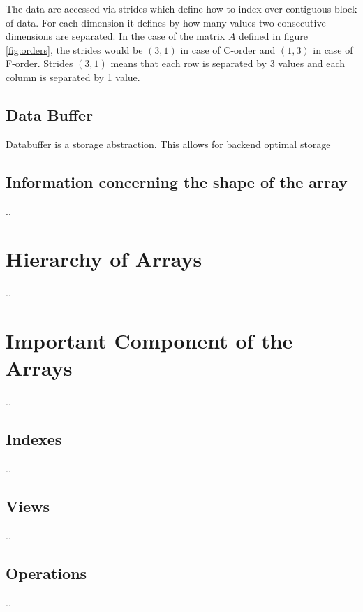 The data are accessed via strides which define how to index over contiguous block of data. For each dimension it defines by how many values two consecutive dimensions are separated. In the case of the matrix $A$ defined in figure \ref{fig:orders}, the strides would be $(3, 1)$ in case of C-order and $(1, 3)$ in case of F-order. Strides $(3, 1)$ means that each row is separated by 3 values and each column is separated by 1 value.

\subsection{Data Buffer}
Databuffer is a storage abstraction. This allows for backend optimal storage


\subsection{Information concerning the shape of the array}
..
\section{Hierarchy of Arrays}
..
\section{Important Component of the Arrays}
..
\subsection{Indexes}
..
\subsection{Views}
..
\subsection{Operations}
..